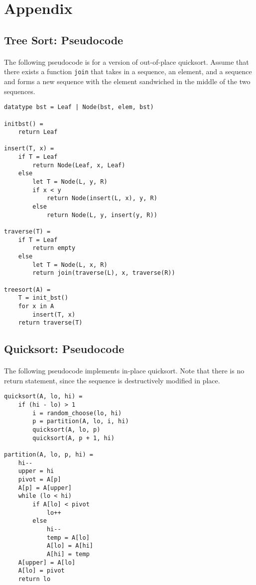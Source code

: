 \documentclass{article}
\begin{document}
\section{Appendix}

\subsection{Tree Sort: Pseudocode}

\paragraph{} The following pseudocode is for a version of out-of-place quicksort. Assume that there exists a function \texttt{join} that takes in a sequence, an element, and a sequence and forms a new sequence with the element sandwiched in the middle of the two sequences.

\begin{verbatim}
datatype bst = Leaf | Node(bst, elem, bst)

initbst() =
    return Leaf

insert(T, x) =
    if T = Leaf
        return Node(Leaf, x, Leaf)
    else
        let T = Node(L, y, R)
        if x < y
            return Node(insert(L, x), y, R)
        else
            return Node(L, y, insert(y, R))

traverse(T) =
    if T = Leaf
        return empty
    else
        let T = Node(L, x, R)
        return join(traverse(L), x, traverse(R))

treesort(A) =
    T = init_bst()
    for x in A
        insert(T, x)
    return traverse(T)
\end{verbatim}


\subsection{Quicksort: Pseudocode}

\paragraph{} The following pseudocode implements in-place quicksort. Note that there is no return statement, since the sequence is destructively modified in place.

\begin{verbatim}
quicksort(A, lo, hi) =
    if (hi - lo) > 1
        i = random_choose(lo, hi)
        p = partition(A, lo, i, hi)
        quicksort(A, lo, p)
        quicksort(A, p + 1, hi)

partition(A, lo, p, hi) =
    hi--
    upper = hi
    pivot = A[p]
    A[p] = A[upper]
    while (lo < hi)
        if A[lo] < pivot
            lo++
        else
            hi--
            temp = A[lo]
            A[lo] = A[hi]
            A[hi] = temp
    A[upper] = A[lo]
    A[lo] = pivot
    return lo
\end{verbatim}
\end{document}
